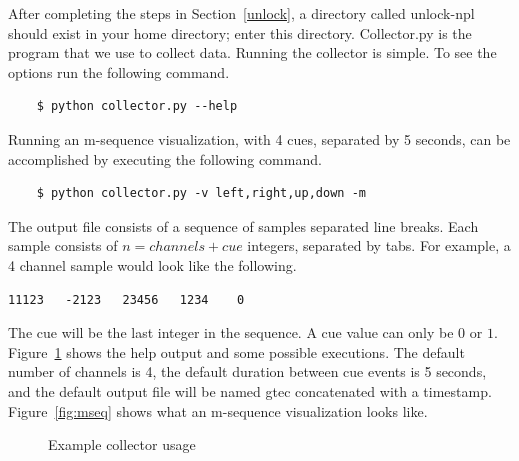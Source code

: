 \documentclass[11pt]{article}
\begin{document}
After completing the steps in Section~\ref{unlock}, a directory called unlock-npl should exist in your home directory; enter this directory.  Collector.py is the program that we use to collect data.  Running the collector is simple.  To see the options run the following command.
\begin{verbatim}
	$ python collector.py --help
\end{verbatim}
Running an m-sequence visualization, with 4 cues, separated by 5 seconds, can be accomplished by executing the following command.  
\begin{verbatim}
	$ python collector.py -v left,right,up,down -m
\end{verbatim}
The output file consists of a sequence of samples separated line breaks.  Each sample consists of $n = channels + cue$ integers, separated by tabs.  For example, a 4 channel sample would look like the following.
\begin{verbatim}
11123	-2123	23456	1234	0
\end{verbatim}
The cue will be the last integer in the sequence.  A cue value can only be $0$ or $1$.  Figure~\ref{fig:cmds} shows the help output and some possible executions.  The default number of channels is 4, the default duration between cue events is 5 seconds, and the default output file will be named gtec concatenated with a timestamp.  Figure~\ref{fig:mseq} shows what an m-sequence visualization looks like.

\begin{figure}[]
\caption{\label{fig:cmds}  Example collector usage}
\end{figure}
\end{document}
